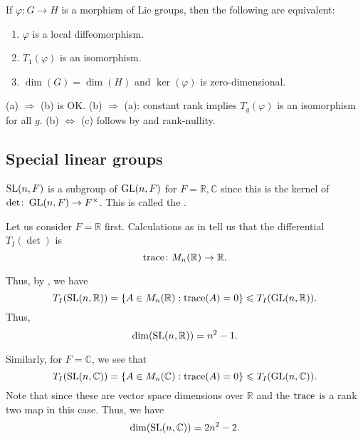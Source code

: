 \documentclass[12pt]{article}
\begin{document}
\begin{cor} \label{cor:local-diffeo-characterisation}
	If $\varphi \colon G \to H$ is a morphism of Lie groups, then the following are equivalent:
	\begin{enumerate}[label=(\alph*)]
		\item $\varphi$ is a local diffeomorphism.
		\item $T_{1}(\varphi)$ is an isomorphism.
		\item $\dim(G) = \dim(H)$ and $\ker(\varphi)$ is zero-dimensional.
	\end{enumerate}
\end{cor}
\begin{sketch}
	(a) $\Rightarrow$ (b) is OK. \newline
	(b)	$\Rightarrow$ (a): constant rank implies $T_{g}(\varphi)$ is an isomorphism for all $g$. \newline
	(b) $\Leftrightarrow$ (c) follows by  and rank-nullity.
\end{sketch}

\subsection{Special linear groups} \label{subsec:SL-subgroup}

$\operatorname{SL}(n, F)$ is a subgroup of $\operatorname{GL}(n, F)$ for $F = \mathbb{R}, \mathbb{C}$ since this is the kernel of $\det \colon \operatorname{GL}(n, F) \to F^{\times}$.
This is called the .

Let us consider $F = \mathbb{R}$ first. 
Calculations as in  tell us that the differential $T_{I}(\det)$ is
\begin{equation*} 
	\operatorname{trace} \colon M_{n}(\mathbb{R}) \to \mathbb{R}.
\end{equation*}

Thus, by , we have
\begin{equation*} 
	T_{I}(\operatorname{SL}(n, \mathbb{R})) = \{A \in M_{n}(\mathbb{R}) : \operatorname{trace}(A) = 0\} \leqslant T_{I}(\operatorname{GL}(n, \mathbb{R})).
\end{equation*}
Thus,
\begin{equation*} 
	\dim(\operatorname{SL}(n, \mathbb{R})) = n^{2} - 1.
\end{equation*}

Similarly, for $F = \mathbb{C}$, we see that
\begin{equation*} 
	T_{I}(\operatorname{SL}(n, \mathbb{C})) = \{A \in M_{n}(\mathbb{C}) : \operatorname{trace}(A) = 0\} \leqslant T_{I}(\operatorname{GL}(n, \mathbb{C})).
\end{equation*}
Note that since these are vector space dimensions over $\mathbb{R}$ and the $\operatorname{trace}$ is a rank two map in this case. Thus, we have
\begin{equation*} 
	\dim(\operatorname{SL}(n, \mathbb{C})) = 2n^{2} - 2.
\end{equation*}
\end{document}
